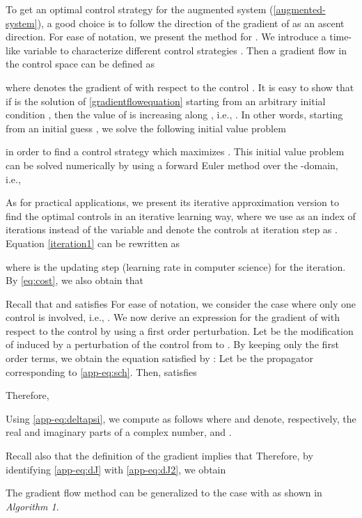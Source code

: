 \documentclass[letterpaper, 10 pt, conference]{ieeeconf}
\begin{document}
To get an optimal control strategy  for the augmented system
(\ref{augmented-system}), a good choice is to follow the
direction of the gradient of  as an ascent direction. For
ease of notation, we present the method for . We introduce a
time-like variable  to characterize different control
strategies . Then a gradient flow in the control space
can be defined as

where  denotes the gradient of  with respect
to the control . It is easy to show that if  is the
solution of \eqref{gradientflowequation} starting from an
arbitrary initial condition , then the value of  is
increasing along , i.e., . In other words, starting from an initial guess , we
solve the following initial value problem

in order to find a control strategy which maximizes . This
initial value problem can be solved numerically by using a forward
Euler method over
the -domain, i.e.,


As for practical applications, we present its iterative
approximation version to find the optimal controls  in an
iterative learning way, where we use  as an index of iterations
instead of the variable  and denote the controls at iteration
step  as .
Equation \eqref{iteration1} can be rewritten as

where  is the updating step (learning rate in computer
science) for the  iteration. By \eqref{eq:cost}, we also obtain that

Recall that  and  satisfies
 For ease of notation, we consider the case where only one control is involved, i.e., . We now derive an expression for the gradient of  with respect to the control  by using a first order perturbation. Let  be the modification of  induced by a perturbation of the control from  to .
By keeping only the first order terms, we obtain the equation satisfied by :
 Let  be the propagator corresponding to \eqref{app-eq:sch}. Then,  satisfies

Therefore,

Using \eqref{app-eq:deltapsi}, we compute  as follows
where  and  denote, respectively, the real and imaginary parts of a complex number, and .

Recall also that the definition of the gradient implies that
Therefore, by identifying \eqref{app-eq:dJ} with \eqref{app-eq:dJ2}, we obtain

The
gradient flow method can be generalized to the case with  as
shown in \emph{Algorithm 1}.
\end{document}
